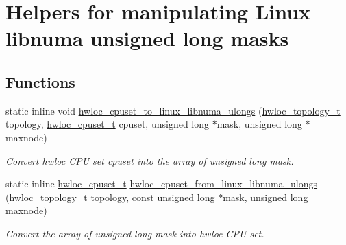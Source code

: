 \hypertarget{group__hwlocality__linux__libnuma__ulongs}{
\section{Helpers for manipulating Linux libnuma unsigned long masks}
\label{group__hwlocality__linux__libnuma__ulongs}
}
\subsection*{Functions}
\begin{DoxyCompactItemize}
\item 
static inline void \hyperlink{group__hwlocality__linux__libnuma__ulongs_ga7119f03aa7437b027edea3a32ebce265}{hwloc\_\-cpuset\_\-to\_\-linux\_\-libnuma\_\-ulongs} (\hyperlink{group__hwlocality__topology_ga9d1e76ee15a7dee158b786c30b6a6e38}{hwloc\_\-topology\_\-t} topology, \hyperlink{group__hwlocality__cpuset_ga7366332f7090f5b54d4b25a0c2c4b411}{hwloc\_\-cpuset\_\-t} cpuset, unsigned long $\ast$mask, unsigned long $\ast$maxnode)
\begin{DoxyCompactList}\small\item\em Convert hwloc CPU set {\ttfamily cpuset} into the array of unsigned long {\ttfamily mask}. \item\end{DoxyCompactList}\item 
static inline \hyperlink{group__hwlocality__cpuset_ga7366332f7090f5b54d4b25a0c2c4b411}{hwloc\_\-cpuset\_\-t} \hyperlink{group__hwlocality__linux__libnuma__ulongs_gaad80d59fee26a1e0ecf7a0bae76dc685}{hwloc\_\-cpuset\_\-from\_\-linux\_\-libnuma\_\-ulongs} (\hyperlink{group__hwlocality__topology_ga9d1e76ee15a7dee158b786c30b6a6e38}{hwloc\_\-topology\_\-t} topology, const unsigned long $\ast$mask, unsigned long maxnode)
\begin{DoxyCompactList}\small\item\em Convert the array of unsigned long {\ttfamily mask} into hwloc CPU set. \item\end{DoxyCompactList}\end{DoxyCompactItemize}



